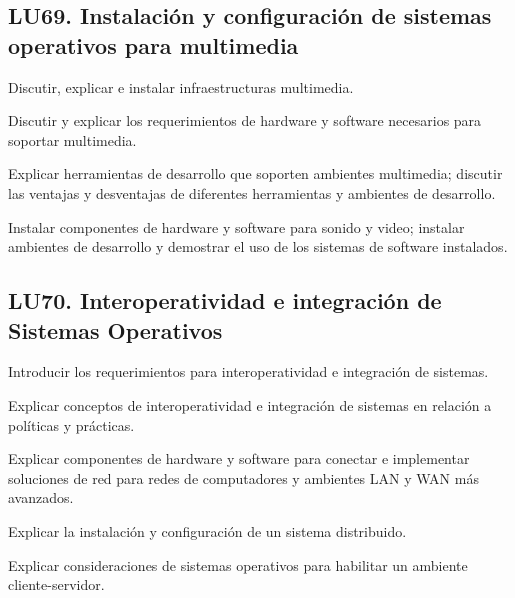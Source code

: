 \subsection{LU69. Instalación y configuración de sistemas operativos para multimedia}\label{sec:LU69}
\begin{LearningUnit}
\begin{LUGoal}
\item Discutir, explicar e instalar infraestructuras multimedia.
\end{LUGoal}

\begin{LUObjective}
\item Discutir y explicar los requerimientos de hardware y software necesarios para soportar multimedia.
\item Explicar herramientas de desarrollo que soporten ambientes multimedia; discutir las ventajas y desventajas de diferentes herramientas y ambientes de desarrollo.
\item Instalar componentes de hardware y software para sonido y video; instalar ambientes de desarrollo y demostrar el uso de los sistemas de software instalados.
\end{LUObjective}
\end{LearningUnit}

\subsection{LU70. Interoperatividad e integración de Sistemas Operativos}\label{sec:LU70}
\begin{LearningUnit}
\begin{LUGoal}
\item Introducir los requerimientos para interoperatividad e integración de sistemas.
\end{LUGoal}

\begin{LUObjective}
\item Explicar conceptos de interoperatividad e integración de sistemas en relación a políticas y prácticas.
\item Explicar componentes de hardware y software para conectar e implementar soluciones de red para redes de computadores y ambientes LAN y WAN más avanzados.
\item Explicar la instalación y configuración de un sistema distribuido.
\item Explicar consideraciones de sistemas operativos para habilitar un ambiente cliente-servidor.
\end{LUObjective}
\end{LearningUnit}

